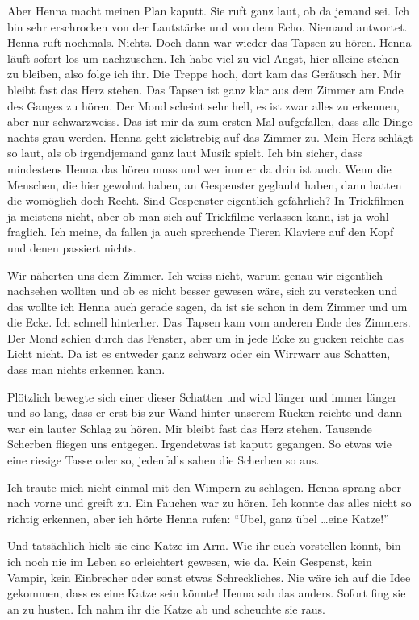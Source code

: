 Aber Henna macht meinen Plan kaputt. Sie ruft ganz laut, ob da jemand sei. Ich
bin sehr erschrocken von der Lautstärke und von dem Echo. Niemand antwortet.
Henna ruft nochmals. Nichts. Doch dann war wieder das Tapsen zu hören. Henna
läuft sofort los um nachzusehen. Ich habe viel zu viel Angst, hier alleine
stehen zu bleiben, also folge ich ihr. Die Treppe hoch, dort kam das Geräusch
her. Mir bleibt fast das Herz stehen. Das Tapsen ist ganz klar aus dem Zimmer
am Ende des Ganges zu hören. Der Mond scheint sehr hell, es ist zwar alles zu
erkennen, aber nur schwarzweiss. Das ist mir da zum ersten Mal aufgefallen,
dass alle Dinge nachts grau werden. Henna geht zielstrebig auf das Zimmer zu.
Mein Herz schlägt so laut, als ob irgendjemand ganz laut Musik spielt. Ich bin
sicher, dass mindestens Henna das hören muss und wer immer da drin ist auch.
Wenn die Menschen, die hier gewohnt haben, an Gespenster geglaubt haben, dann hatten die womöglich doch Recht. Sind Gespenster eigentlich gefährlich? In Trickfilmen ja meistens nicht, aber ob man sich auf Trickfilme verlassen kann, ist ja wohl fraglich. Ich meine, da fallen ja auch sprechende Tieren Klaviere auf den Kopf und denen passiert nichts. 

Wir näherten uns dem Zimmer. Ich weiss nicht, warum genau wir eigentlich nachsehen wollten und ob es nicht besser gewesen wäre, sich zu verstecken und das wollte ich Henna auch gerade sagen, da ist sie schon in dem Zimmer und um die Ecke. Ich schnell hinterher. Das Tapsen kam vom anderen Ende des Zimmers. Der Mond schien durch das Fenster, aber um in jede Ecke zu gucken reichte das Licht nicht. Da ist es entweder ganz schwarz oder ein Wirrwarr aus Schatten, dass man nichts erkennen kann.

Plötzlich bewegte sich einer dieser Schatten und wird länger und immer länger
und so lang, dass er erst bis zur Wand hinter unserem Rücken reichte und dann
war ein lauter Schlag zu hören. Mir bleibt fast das Herz stehen. Tausende Scherben fliegen uns entgegen. Irgendetwas ist kaputt gegangen. So etwas wie eine riesige Tasse oder so, jedenfalls sahen die Scherben so aus.

Ich traute mich nicht einmal mit den Wimpern zu schlagen. Henna sprang aber nach vorne und greift zu. Ein Fauchen war zu hören. Ich konnte das alles nicht so richtig erkennen, aber ich hörte Henna rufen: \enquote{Übel, ganz übel \dots eine Katze!}

Und tatsächlich hielt sie eine Katze im Arm. Wie ihr euch vorstellen könnt, bin
ich noch nie im Leben so erleichtert gewesen, wie da. Kein Gespenst, kein Vampir, kein Einbrecher oder sonst etwas Schreckliches. Nie wäre ich auf die Idee gekommen, dass es eine Katze sein könnte! Henna sah das anders. Sofort fing sie an zu husten. Ich nahm ihr die Katze ab und scheuchte sie raus. 

